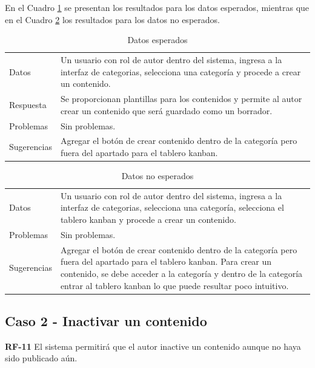 \documentclass[10pt,times,twocolumn]{article}
\begin{document}
En el Cuadro \ref{tab:caso1_esperado} se presentan los resultados para los datos esperados, mientras que en el Cuadro \ref{tab:caso1_no_esperado} los resultados para los datos no esperados.

\begin{table}[H]
    \centering
    \begin{tabular}{p{3cm}p{4cm}}
        \rowcolor{gray!15}
        Datos & Un usuario con rol de autor dentro del sistema, ingresa a la interfaz de categorias, selecciona una categoría y procede a crear un contenido. \\
       	Respuesta & Se proporcionan plantillas para los contenidos y permite al autor crear un contenido que será guardado como un borrador. \\
       	Problemas & Sin problemas. \\
       	Sugerencias & Agregar el botón de crear contenido dentro de la categoría pero fuera del apartado para el tablero kanban. \\
    \end{tabular}
    \caption{Datos esperados}
    \label{tab:caso1_esperado}
\end{table}

\begin{table}[H]
    \centering
    \begin{tabular}{p{3cm}p{4cm}}
        \rowcolor{gray!15}
        Datos & Un usuario con rol de autor dentro del sistema, ingresa a la interfaz de categorias, selecciona una categoría, selecciona el tablero kanban y procede a crear un contenido.\\
       	Problemas & Sin problemas. \\
       	Sugerencias & Agregar el botón de crear contenido dentro de la categoría pero fuera del apartado para el tablero kanban. Para crear un contenido, se debe acceder a la categoría y dentro de la categoría entrar al tablero kanban lo que puede resultar poco intuitivo.\\
    \end{tabular}
    \caption{Datos no esperados}
    \label{tab:caso1_no_esperado}
\end{table}

\subsection{Caso 2 - Inactivar un contenido}
\textbf{RF-11} El sistema permitirá que el autor inactive un contenido aunque no haya sido publicado aún.
\end{document}
